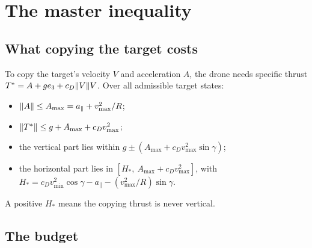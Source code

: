 \chapter{The master inequality}
\label{chap:master}

\section{What copying the target costs}

\begin{lemma}
\label{lem:thrust-demand}
\leanok
{}
To copy the target's velocity $V$ and acceleration $A$, the drone needs specific thrust
$T^*=A+ge_3+c_D\lVert V \rVert V$. Over all admissible target states:
\begin{itemize}
  \item $\lVert A \rVert\le A_{\max}=a_\parallel+v_{\max}^2/R$;
  \item $\lVert T^* \rVert\le g+A_{\max}+c_Dv_{\max}^2$;
  \item the vertical part lies within $g\pm(A_{\max}+c_Dv_{\max}^2\sin\gamma)$;
  \item the horizontal part lies in $[H_*,\ A_{\max}+c_Dv_{\max}^2]$, with
        $H_*=c_Dv_{\min}^2\cos\gamma-a_\parallel-(v_{\max}^2/R)\sin\gamma$.
\end{itemize}
A positive $H_*$ means the copying thrust is never vertical.
\end{lemma}

\section{The budget}

